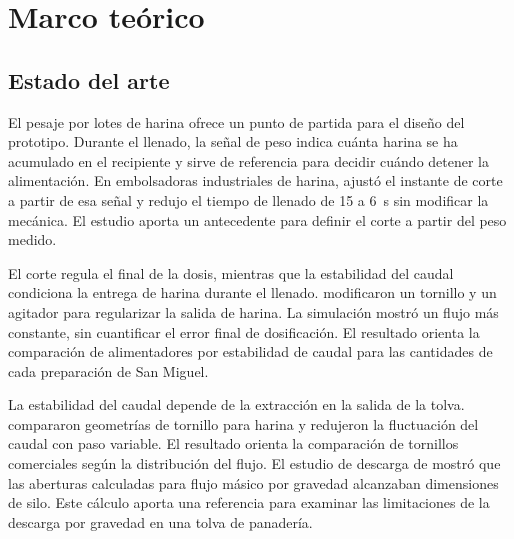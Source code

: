 \chapter{Marco teórico}
\label{sec:teoria}

\raggedbottom


\section{Estado del arte}
\label{sec:teoria_estado}

El pesaje por lotes de harina ofrece un punto de partida para el diseño
del prototipo. Durante el llenado, la señal de peso indica cuánta harina
se ha acumulado en el recipiente y sirve de referencia para decidir
cuándo detener la alimentación. En embolsadoras industriales de harina,
\textcite{gebov2023algorithmic} ajustó el instante de corte a partir de
esa señal y redujo el tiempo de llenado de 15 a 6~s sin modificar la
mecánica. El estudio aporta un antecedente para definir el corte a partir
del peso medido.

El corte regula el final de la dosis, mientras que la estabilidad del
caudal condiciona la entrega de harina durante el llenado.
\textcite{budijono2021flour} modificaron un tornillo y un
agitador para regularizar la salida de harina. La simulación mostró un
flujo más constante, sin cuantificar el error final de dosificación. El
resultado orienta la comparación de alimentadores por estabilidad de
caudal para las cantidades de cada preparación de San Miguel.

La estabilidad del caudal depende de la extracción en la salida de la tolva.
\textcite{xu2021screw} compararon geometrías de tornillo para harina y
redujeron la fluctuación del caudal con paso variable. El resultado orienta
la comparación de tornillos comerciales según la distribución del flujo.
El estudio de descarga de \textcite{rivera2023flour} mostró que las
aberturas calculadas para flujo másico por gravedad alcanzaban dimensiones
de silo. Este cálculo aporta una referencia para examinar las limitaciones
de la descarga por gravedad en una tolva de panadería.

